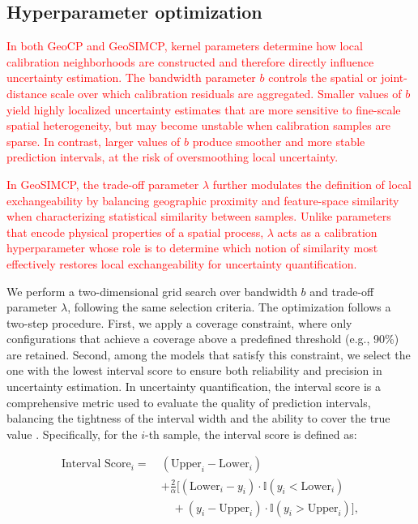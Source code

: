 \documentclass[authoryear,preprint,review,12pt]{elsarticle}
\begin{document}
\subsection{Hyperparameter optimization}


\textcolor{red}{In both GeoCP and GeoSIMCP, kernel parameters determine how local calibration neighborhoods are constructed and therefore directly influence uncertainty estimation. The bandwidth parameter \(b\) controls the spatial or joint-distance scale over which calibration residuals are aggregated. Smaller values of  \(b\) yield highly localized uncertainty estimates that are more sensitive to fine-scale spatial heterogeneity, but may become unstable when calibration samples are sparse. In contrast, larger values of \(b\) produce smoother and more stable prediction intervals, at the risk of oversmoothing local uncertainty.}

\textcolor{red}{In GeoSIMCP, the trade-off parameter \(\lambda\) further modulates the definition of local exchangeability by balancing geographic proximity and feature-space similarity when characterizing statistical similarity between samples. Unlike parameters that encode physical properties of a spatial process, \(\lambda\) acts as a calibration hyperparameter whose role is to determine which notion of similarity most effectively restores local exchangeability for uncertainty quantification.}

We perform a two-dimensional grid search over bandwidth \(b\) and trade-off parameter \(\lambda\), following the same selection criteria. The optimization follows a two-step procedure. First, we apply a coverage constraint, where only configurations that achieve a coverage above a predefined threshold (e.g., 90\%) are retained. Second, among the models that satisfy this constraint, we select the one with the lowest interval score to ensure both reliability and precision in uncertainty estimation. In uncertainty quantification, the interval score is a comprehensive metric used to evaluate the quality of prediction intervals, balancing the tightness of the interval width and the ability to cover the true value \citep{hofer2022comparing}. Specifically, for the \(i\)-th sample, the interval score is defined as:

\begin{equation}
\begin{aligned}
\text{Interval Score}_i =\ & (\text{Upper}_i - \text{Lower}_i) \\
& + \frac{2}{\alpha} \Big[ (\text{Lower}_i - y_i) \cdot \mathbb{I}(y_i < \text{Lower}_i) \\
& \quad + (y_i - \text{Upper}_i) \cdot \mathbb{I}(y_i > \text{Upper}_i) \Big],
\end{aligned}
\end{equation}
\end{document}
